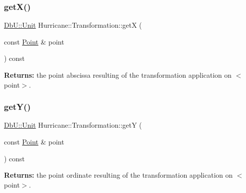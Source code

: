 \mbox{\label{classHurricane_1_1Transformation_adcd79ae74399431387d246dce68b8d70}} 
\subsubsection{\texorpdfstring{get\+X()}{getX()}\hspace{0.1cm}{\footnotesize\ttfamily [2/2]}}
{\footnotesize\ttfamily \hyperlink{group__DbUGroup_ga4fbfa3e8c89347af76c9628ea06c4146}{Db\+U\+::\+Unit} Hurricane\+::\+Transformation\+::getX (\begin{DoxyParamCaption}\item[{const \hyperlink{classHurricane_1_1Point}{Point} \&}]{point }\end{DoxyParamCaption}) const}

{\bfseries Returns\+:} the point abscissa resulting of the transformation application on {\ttfamily $<$point$>$}. \mbox{\label{classHurricane_1_1Transformation_a87152b7b585cf409950e9aba878143d5}} 
\subsubsection{\texorpdfstring{get\+Y()}{getY()}\hspace{0.1cm}{\footnotesize\ttfamily [2/2]}}
{\footnotesize\ttfamily \hyperlink{group__DbUGroup_ga4fbfa3e8c89347af76c9628ea06c4146}{Db\+U\+::\+Unit} Hurricane\+::\+Transformation\+::getY (\begin{DoxyParamCaption}\item[{const \hyperlink{classHurricane_1_1Point}{Point} \&}]{point }\end{DoxyParamCaption}) const}

{\bfseries Returns\+:} the point ordinate resulting of the transformation application on {\ttfamily $<$point$>$}. \mbox{\label{classHurricane_1_1Transformation_a2c20ee8506ad770a28c2e2b91e9b0153}} 
